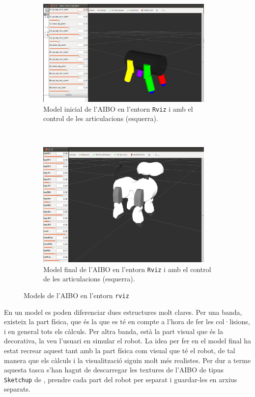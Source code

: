\documentclass[12pt,a4paper,final,twoside]{article}
\begin{document}
\begin{figure}[tb]
\centering
\begin{subfigure}[b]{0.45\textwidth}
    \centering
    \includegraphics[width=0.95\textwidth]{Imatges/aibo-model-inicial.png}
    \caption{Model inicial de l'AIBO en l'entorn \texttt{Rviz} i amb el control de les articulacions (esquerra).}
    \label{fig:aibo-model-inicial}
\end{subfigure}
~
\begin{subfigure}[b]{0.45\textwidth}
    \centering
    \includegraphics[width=0.95\textwidth]{Imatges/aibo-model-final.png}
    \caption{Model final de l'AIBO en l'entorn \texttt{Rviz} i amb el control de les articulacions (esquerra).}
    \label{fig:aibo-model-final}
\end{subfigure}
\caption{Models de l'AIBO en l'entorn \texttt{rviz}}
\end{figure}

En un model es poden diferenciar dues estructures molt clares. Per una banda, existeix la part física, que és la que es té en compte a l'hora de fer les col·lisions, i en general tots els càlculs. Per altra banda, està la part visual que és la decorativa, la veu l'usuari en simular el robot. La idea per fer en el model final ha estat recrear aquest tant amb la part física com visual que té el robot, de tal manera que els càlculs i la visualització siguin molt més realistes. Per dur a terme aquesta tasca s'han hagut de descarregar les textures de l'AIBO de tipus \texttt{Sketchup} de \cite{SeaGate}, prendre cada part del robot per separat i guardar-les en arxius separats. 
\end{document}
